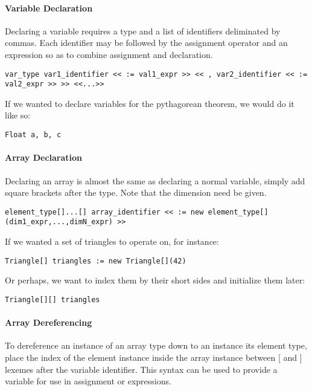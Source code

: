 \paragraph{Variable Declaration}
Declaring a variable requires a type and a list of identifiers deliminated by commas. Each identifier may be followed by the assignment operator and an expression so as to combine assignment and declaration.

\begin{lstlisting}
var_type var1_identifier << := val1_expr >> << , var2_identifier << := val2_expr >> >> <<...>>
\end{lstlisting}

If we wanted to declare variables for the pythagorean theorem, we would do it like so:

\begin{lstlisting}[caption=Variable Initialization for the Pythagorean Theorem,backgroundcolor=\color{tintedorange}]
Float a, b, c
\end{lstlisting}

\paragraph{Array Declaration}
Declaring an array is almost the same as declaring a normal variable, simply add square brackets after the type. Note that the dimension need be given.

\begin{lstlisting}
element_type[]...[] array_identifier << := new element_type[](dim1_expr,...,dimN_expr) >>
\end{lstlisting}

If we wanted a set of triangles to operate on, for instance:

\begin{lstlisting}[caption=Array Declaration and Instantiation of Many Triangles, backgroundcolor=\color{tintedorange}]
Triangle[] triangles := new Triangle[](42)
\end{lstlisting}

Or perhaps, we want to index them by their short sides and initialize them later:

\begin{lstlisting}[caption=Array Declaration of a 2-Degree Triangle Array,backgroundcolor=\color{tintedorange}]
Triangle[][] triangles
\end{lstlisting}

\paragraph{Array Dereferencing}
To dereference an instance of an array type down to an instance its element type, place the index of the element instance inside the array instance between [ and ] lexemes after the variable identifier. This syntax can be used to provide a variable for use in assignment or expressions.

